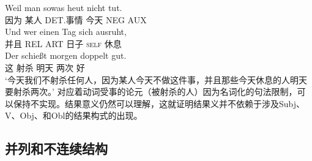 \begin{exe}
\begin{xlist}[iv.]
\begin{exe}
\begin{xlist}[iv.]
\gll  Weil  man sowas heut nicht tut.\\
      因为 某人 DET.事情 今天 NEG AUX\\
\gll Und wer einen Tag sich ausruht,\\
     并且 REL ART 日子 \textsc{self} 休息\\
\gll Der schießt morgen doppelt gut.\footnotemark\\
这 射杀 明天 两次 好\\
\glt `今天我们不射杀任何人，因为某人今天不做这件事，并且那些今天休息的人明天要射杀两次。'
\zl
对应着动词受事的论元（被射杀的人）因为名词化的句法限制，可以保持不实现。结果意义仍然可以理解，这就证明结果义并不依赖于涉及Subj、V、Obj、和Obl的结果构式的出现。

\subsection{并列和不连续结构}
\label{Abschnitt-Koordination}
\label{Abschnitt-Koordination-diskont}\label{sec-coordination-cg}


\end{xlist}
\end{exe}
\end{xlist}
\end{exe}
